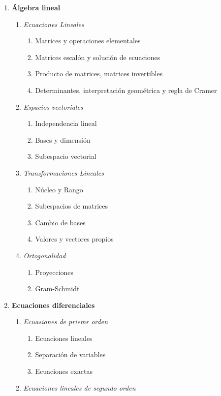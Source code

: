 \documentclass[10pt,a4paper]{article}
\begin{document}
\begin{enumerate}
	\item \textbf{Álgebra lineal}
	\begin{enumerate}
		\item \textit{Ecuaciones Lineales}
		\begin{enumerate}
			\item Matrices y operaciones elementales
			\item Matrices escalón y solución de ecuaciones
			\item Producto de matrices, matrices invertibles
			\item Determinantes, interpretación geométrica y regla de Cramer
		\end{enumerate}
		\item \textit{Espacios vectoriales}
		\begin{enumerate}
			\item Independencia lineal
			\item Bases y dimensión
			\item Subespacio vectorial
		\end{enumerate}
		\item \textit{Transformaciones Lineales}
		\begin{enumerate}
			\item Núcleo y Rango
			\item Subespacios de matrices
			\item Cambio de bases
			\item Valores y vectores propios
		\end{enumerate}
		\item \textit{Ortogonalidad}
		\begin{enumerate}
			\item Proyecciones
			\item Gram-Schmidt
		\end{enumerate}
	\end{enumerate}
	\item \textbf{Ecuaciones diferenciales}
	\begin{enumerate}
		\item \textit{Ecuasiones de priemr orden}
		\begin{enumerate}
			\item Ecuaciones lineales
			\item Separación de variables
			\item Ecuaciones exactas
		\end{enumerate}
		\item \textit{Ecuaciones lineales de segundo orden}
		\begin{enumerate}

\end{enumerate}
\end{enumerate}
\end{enumerate}
\end{document}
